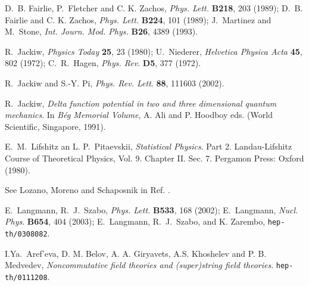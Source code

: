 \documentclass[a4paper,11pt]{article}
\begin{document}
\begin{thebibliography}{99}
D.~B. Fairlie, P.~Fletcher and C. K. Zachos,
{\sl Phys. Lett.} {\bf B218}, 203 (1989);
D.~B. Fairlie and C. K. Zachos,
{\sl Phys. Lett.} {\bf B224}, 101 (1989);
J.~Martinez and M.~Stone,
{\sl Int. Journ. Mod. Phys.} {\bf B26}, 4389 (1993).

R.~Jackiw, {\sl Physics Today} {\bf 25}, 23 (1980);
U.~Niederer, {\sl Helvetica Physica Acta} {\bf 45}, 802 (1972);
C.~R.~Hagen, {\sl Phys. Rev}. {\bf D5}, 377 (1972).

R.~Jackiw and S.-Y. Pi,
{\sl Phys. Rev. Lett}. {\bf 88}, 111603 (2002).

R.~Jackiw,
{\it Delta function potential in two and three dimensional
quantum mechanics}. In {\it B\'eg Memorial Volume},
A. Ali and P. Hoodboy eds. (World Scientific, Singapore, 1991).

E.~M.~Lifshitz an L. P.~Pitaevskii,
{\it Statistical Physics}. Part 2. %
  Landau-Lifshitz Course of Theoretical Physics,
Vol. 9. Chapter II. Sec. 7. Pergamon Press: Oxford (1980).

See Lozano, Moreno and Schaposnik in
Ref. \cite{Baketal}.

  E.~Langmann, R.~J.~Szabo,
{\sl Phys. Lett.} {\bf B533}, 168 (2002);
  E.~Langmann, {\sl Nucl. Phys}. {\bf B654}, 404 (2003);
E.~Langmann, R.~J.~Szabo, and K. Zarembo,
\texttt{hep-th/0308082}.

I.Ya.~Aref'eva, D. M. Belov, A. A. Giryavets,
A.S. Khoshelev and P. B. Medvedev,
{\it Noncommutative field theories and (super)string
field theories}. \texttt{hep-th/0111208}.

\end{thebibliography}
\end{document}
